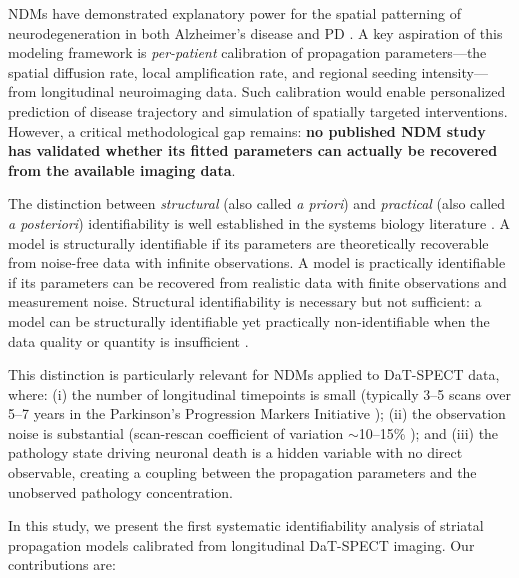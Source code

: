 NDMs have demonstrated explanatory power for the spatial patterning of neurodegeneration in both Alzheimer's disease \cite{schafer2021, fornari2019} and PD \cite{pandya2019, zheng2019, abdelgawad2022}. A key aspiration of this modeling framework is \textit{per-patient} calibration of propagation parameters---the spatial diffusion rate, local amplification rate, and regional seeding intensity---from longitudinal neuroimaging data. Such calibration would enable personalized prediction of disease trajectory and simulation of spatially targeted interventions. However, a critical methodological gap remains: \textbf{no published NDM study has validated whether its fitted parameters can actually be recovered from the available imaging data}.

The distinction between \textit{structural} (also called \textit{a priori}) and \textit{practical} (also called \textit{a posteriori}) identifiability is well established in the systems biology literature \cite{raue2009, villaverde2016, wieland2021}. A model is structurally identifiable if its parameters are theoretically recoverable from noise-free data with infinite observations. A model is practically identifiable if its parameters can be recovered from realistic data with finite observations and measurement noise. Structural identifiability is necessary but not sufficient: a model can be structurally identifiable yet practically non-identifiable when the data quality or quantity is insufficient \cite{wang2025, conte2024}.

This distinction is particularly relevant for NDMs applied to DaT-SPECT data, where: (i) the number of longitudinal timepoints is small (typically 3--5 scans over 5--7 years in the Parkinson's Progression Markers Initiative \cite{ppmi2011}); (ii) the observation noise is substantial (scan-rescan coefficient of variation $\sim$10--15\% \cite{tossicibolt2017}); and (iii) the pathology state driving neuronal death is a hidden variable with no direct observable, creating a coupling between the propagation parameters and the unobserved pathology concentration.

In this study, we present the first systematic identifiability analysis of striatal propagation models calibrated from longitudinal DaT-SPECT imaging. Our contributions are:

